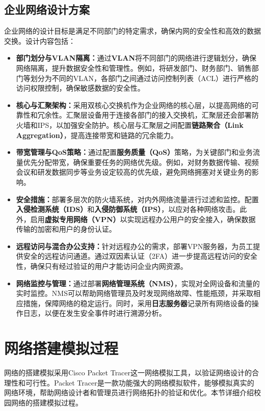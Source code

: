 \documentclass[12pt]{article}
\begin{document}
\subsection{企业网络设计方案}
企业网络的设计目标是满足不同部门的特定需求，确保内网的安全性和高效的数据交换。设计内容包括：

\begin{itemize}
    \item \textbf{部门划分与VLAN隔离：}通过\textbf{VLAN}将不同部门的网络进行逻辑划分，确保网络隔离，提升数据安全性和管理性。例如，将研发部门、财务部门、销售部门等划分为不同的VLAN，各部门之间通过访问控制列表（ACL）进行严格的访问权限控制，确保敏感数据的安全性。
    \item \textbf{核心与汇聚架构：}采用双核心交换机作为企业网络的核心层，以提高网络的可靠性和冗余性。汇聚层设备用于连接各部门的接入交换机，汇聚层还会部署防火墙和IPS，以加强安全防护。核心层与汇聚层之间配置\textbf{链路聚合（Link Aggregation）}，提高连接带宽和链路的冗余能力。
    \item \textbf{带宽管理与QoS策略：}通过配置\textbf{服务质量（QoS）}策略，为关键部门和业务流量优先分配带宽，确保重要任务的网络优先级。例如，对财务数据传输、视频会议和研发数据同步等业务设定较高的优先级，避免网络拥塞对关键业务的影响。
    \item \textbf{安全措施：}部署多层次的防火墙系统，对内外网络流量进行过滤和监控。配置\textbf{入侵检测系统（IDS）}和\textbf{入侵防御系统（IPS）}，以应对各种网络攻击。此外，启用\textbf{虚拟专用网络（VPN）}以实现远程办公用户的安全接入，确保数据传输的加密和用户的身份认证。
    \item \textbf{远程访问与混合办公支持：}针对远程办公的需求，部署VPN服务器，为员工提供安全的远程访问通道。通过双因素认证（2FA）进一步提高远程访问的安全性，确保只有经过验证的用户才能访问企业内网资源。
    \item \textbf{网络监控与管理：}通过部署\textbf{网络管理系统（NMS）}，实现对全网设备和流量的实时监控。NMS可以帮助网络管理员及时发现网络故障、性能瓶颈，并采取相应措施，保障网络的稳定运行。同时，采用\textbf{日志服务器}记录所有网络设备的操作日志，以便在发生安全事件时进行溯源分析。
\end{itemize}

\section{网络搭建模拟过程}
网络的搭建模拟采用Cisco Packet Tracer这一网络模拟工具，以验证网络设计的合理性和可行性。Packet Tracer是一款功能强大的网络模拟软件，能够模拟真实的网络环境，帮助网络设计者和管理员进行网络拓扑的验证和优化。本节详细介绍校园网络的搭建模拟过程。
\end{document}
